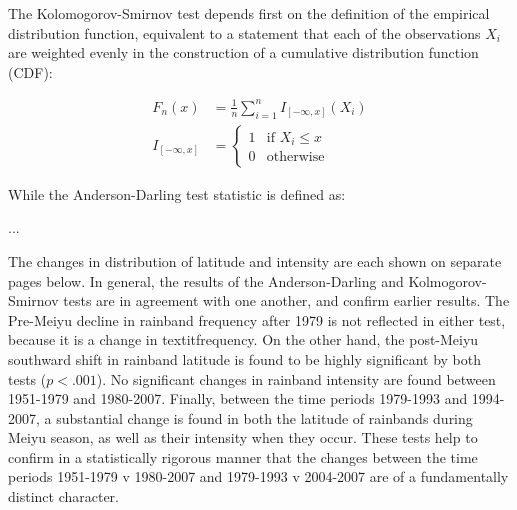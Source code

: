 The Kolomogorov-Smirnov test depends first on the definition of the empirical distribution function, equivalent to a statement that each of the observations $X_i$ are weighted evenly in the construction of a cumulative distribution function (CDF):

\begin{align}
	
	F_n (x) &= \frac{1}{n}\sum_{i=1}^n I_{[-\infty,x]} (X_i) \\
	I_{[-\infty,x]} &=
	\begin{cases}
   		 1 & \text{if } X_i \leq x\\
    		0 & \text{otherwise}
    	\end{cases}

\end{align}

While the Anderson-Darling test statistic is defined as:

...

The changes in distribution of latitude and intensity are each shown on separate pages below. In general, the results of the Anderson-Darling and Kolmogorov-Smirnov tests are in agreement with one another, and confirm earlier results. The Pre-Meiyu decline in rainband frequency after 1979 is not reflected in either test, because it is a change in textit{frequency}. On the other hand, the post-Meiyu southward shift in rainband latitude is found to be highly significant by both tests ($p<.001$). No significant changes in rainband intensity are found between 1951-1979 and 1980-2007. Finally, between the time periods 1979-1993 and 1994-2007, a substantial change is found in both the latitude of rainbands during Meiyu season, as well as their intensity when they occur. These tests help to confirm in a statistically rigorous manner that the changes between the time periods 1951-1979 v 1980-2007 and 1979-1993 v 2004-2007 are of a fundamentally distinct character.

